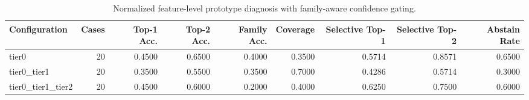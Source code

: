 \begin{table}[t]
\centering
\caption{Normalized feature-level prototype diagnosis with family-aware confidence gating.}
\label{tab:dice_stressor_hierarchical_diagnosis}
\footnotesize
\begin{tabular}{lrrrrrrrr}
\toprule
Configuration & Cases & Top-1 Acc. & Top-2 Acc. & Family Acc. & Coverage & Selective Top-1 & Selective Top-2 & Abstain Rate \\
\midrule
tier0 & 20 & 0.4500 & 0.6500 & 0.4000 & 0.3500 & 0.5714 & 0.8571 & 0.6500 \\
tier0_tier1 & 20 & 0.3500 & 0.5500 & 0.3500 & 0.7000 & 0.4286 & 0.5714 & 0.3000 \\
tier0_tier1_tier2 & 20 & 0.4500 & 0.6000 & 0.2000 & 0.4000 & 0.6250 & 0.7500 & 0.6000 \\
\bottomrule
\end{tabular}

\end{table}
